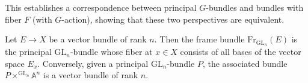 \documentclass[12pt]{article}
\begin{document}
This establishes a correspondence between principal $G$-bundles and bundles with fiber $F$ (with $G$-action), showing that these two perspectives are equivalent.

\begin{example}
    Let $E \to X$ be a vector bundle of rank $n$. Then the frame bundle $\text{Fr}_{\text{GL}_n}(E)$ is the principal $\text{GL}_n$-bundle whose fiber at $x \in X$ consists of all bases of the vector space $E_x$. Conversely, given a principal $\text{GL}_n$-bundle $P$, the associated bundle $P \times^{\text{GL}_n} \mathbb{A}^n$ is a vector bundle of rank $n$.
\end{example}
\end{document}
